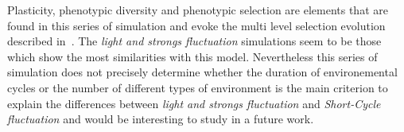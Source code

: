 Plasticity, phenotypic diversity and phenotypic selection are elements that are found in this series of simulation and evoke the  multi level selection evolution described in~\citep{jablonka2014evolution}. The \emph{light and strongs fluctuation} simulations seem to be those which show the most similarities with this model. Nevertheless this series of simulation does not precisely determine whether the duration of environemental cycles or the number of different types of environment is the main criterion to explain the differences between \emph{light and strongs fluctuation} and \emph{Short-Cycle fluctuation} and would be interesting to study in a future work.